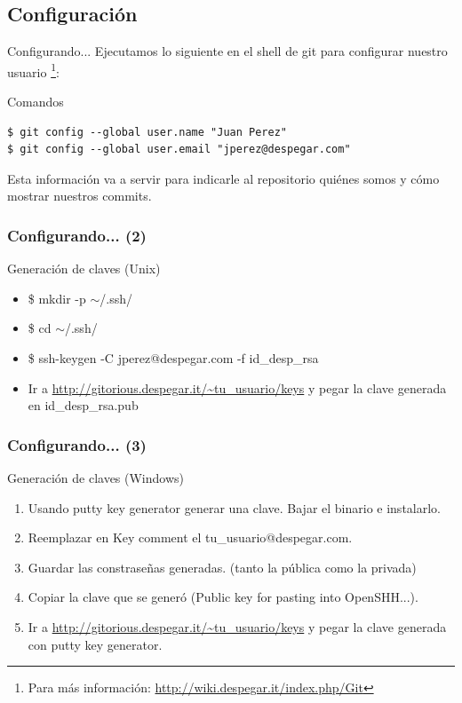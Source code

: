 \documentclass{beamer}
\begin{document}
\subsection{Configuración}
\begin{frame}[fragile]{Configurando...}
  Ejecutamos lo siguiente en el shell de git para configurar nuestro usuario \footnote{Para más información: \url{http://wiki.despegar.it/index.php/Git}}:
  
  \begin{block}{Comandos}
  \begin{verbatim}
$ git config --global user.name "Juan Perez"
$ git config --global user.email "jperez@despegar.com"
  \end{verbatim}
  \end{block}

  Esta información va a servir para indicarle al repositorio quiénes somos y cómo mostrar nuestros commits.
  
\end{frame}

\begin{frame}\frametitle{Configurando... (2)}
  \begin{block}{Generación de claves (Unix)}
  \begin{itemize}
    \item \$ mkdir -p  $\sim$/.ssh/ \pause 
    \item \$ cd $\sim$/.ssh/ \pause 
    \item \$ ssh-keygen -C jperez@despegar.com -f id\_desp\_rsa \pause 
    \item Ir a \url{http://gitorious.despegar.it/~tu\_usuario/keys} y pegar la clave generada en id\_desp\_rsa.pub
  \end{itemize}
  \end{block}
  
\end{frame}

\begin{frame}\frametitle{Configurando... (3)}

 \begin{block}{Generación de claves (Windows)}
  \begin{enumerate}
   \item Usando putty key generator generar una clave. Bajar el binario e instalarlo. \pause 
    \item Reemplazar en Key comment el tu\_usuario@despegar.com. \pause 
    \item Guardar las constraseñas generadas. (tanto la pública como la privada) \pause 
    \item Copiar la clave que se generó (Public key for pasting into OpenSHH...). \pause 
    \item Ir a \url{http://gitorious.despegar.it/~tu\_usuario/keys} y pegar la clave generada con putty key generator.
  \end{enumerate}

  \end{block}
\end{frame}
\end{document}
